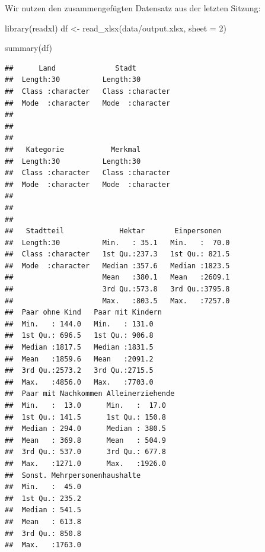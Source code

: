 \documentclass[
]{book}
\newenvironment{Shaded}{\begin{snugshade}}{\end{snugshade}}
\newcommand{\AttributeTok}[1]{\textcolor[rgb]{0.77,0.63,0.00}{#1}}
\newcommand{\DecValTok}[1]{\textcolor[rgb]{0.00,0.00,0.81}{#1}}
\newcommand{\FunctionTok}[1]{\textcolor[rgb]{0.00,0.00,0.00}{#1}}
\newcommand{\NormalTok}[1]{#1}
\newcommand{\OtherTok}[1]{\textcolor[rgb]{0.56,0.35,0.01}{#1}}
\newcommand{\StringTok}[1]{\textcolor[rgb]{0.31,0.60,0.02}{#1}}
\begin{document}
Wir nutzen den zusammengefügten Datensatz aus der letzten Sitzung:

\begin{Shaded}
\begin{Highlighting}[]
\FunctionTok{library}\NormalTok{(readxl)}
\NormalTok{df }\OtherTok{\textless{}{-}} \FunctionTok{read\_xlsx}\NormalTok{(}\StringTok{\textquotesingle{}data/output.xlsx\textquotesingle{}}\NormalTok{, }\AttributeTok{sheet =} \DecValTok{2}\NormalTok{)}

\FunctionTok{summary}\NormalTok{(df)}
\end{Highlighting}
\end{Shaded}

\begin{verbatim}
##      Land              Stadt          
##  Length:30          Length:30         
##  Class :character   Class :character  
##  Mode  :character   Mode  :character  
##                                       
##                                       
##                                       
##   Kategorie           Merkmal         
##  Length:30          Length:30         
##  Class :character   Class :character  
##  Mode  :character   Mode  :character  
##                                       
##                                       
##                                       
##   Stadtteil             Hektar       Einpersonen    
##  Length:30          Min.   : 35.1   Min.   :  70.0  
##  Class :character   1st Qu.:237.3   1st Qu.: 821.5  
##  Mode  :character   Median :357.6   Median :1823.5  
##                     Mean   :380.1   Mean   :2609.1  
##                     3rd Qu.:573.8   3rd Qu.:3795.8  
##                     Max.   :803.5   Max.   :7257.0  
##  Paar ohne Kind   Paar mit Kindern
##  Min.   : 144.0   Min.   : 131.0  
##  1st Qu.: 696.5   1st Qu.: 906.8  
##  Median :1817.5   Median :1831.5  
##  Mean   :1859.6   Mean   :2091.2  
##  3rd Qu.:2573.2   3rd Qu.:2715.5  
##  Max.   :4856.0   Max.   :7703.0  
##  Paar mit Nachkommen Alleinerziehende
##  Min.   :  13.0      Min.   :  17.0  
##  1st Qu.: 141.5      1st Qu.: 150.8  
##  Median : 294.0      Median : 380.5  
##  Mean   : 369.8      Mean   : 504.9  
##  3rd Qu.: 537.0      3rd Qu.: 677.8  
##  Max.   :1271.0      Max.   :1926.0  
##  Sonst. Mehrpersonenhaushalte
##  Min.   :  45.0              
##  1st Qu.: 235.2              
##  Median : 541.5              
##  Mean   : 613.8              
##  3rd Qu.: 850.8              
##  Max.   :1763.0
\end{verbatim}
\end{document}
